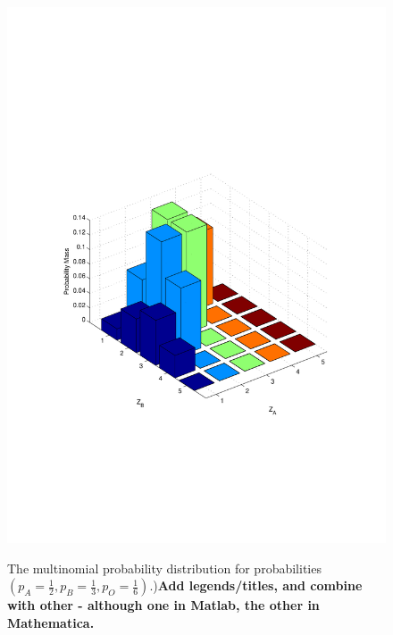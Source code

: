 \documentclass[11pt,fullpage]{book}
\begin{document}
\begin{figure}
\centering
\scalebox{0.3} 
{\includegraphics{Distributions_multinomial.pdf}}
\caption{The multinomial probability distribution for probabilities $(p_A=\frac{1}{2},p_B=\frac{1}{3},p_O = \frac{1}{6})$.)\textbf{Add legends/titles, and combine with other - although one in Matlab, the other in Mathematica.}}\label{fig:Distributions_multinomial}
\end{figure}
\end{document}
